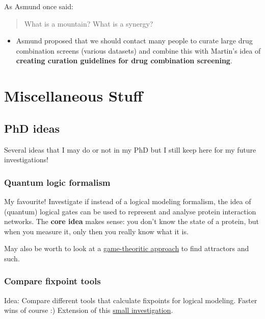 \documentclass[
  12pt,
]{book}
\providecommand{\tightlist}{%
  \setlength{\itemsep}{0pt}\setlength{\parskip}{0pt}}
\begin{document}
As Asmund once said:

\begin{quote}
What is a mountain? What is a synergy?
\end{quote}

\begin{itemize}
\tightlist
\item
  Asmund proposed that we should contact many people to curate large drug combination screens (various datasets) and combine this with Martin's idea of \textbf{creating curation guidelines for drug combination screening}.
\end{itemize}

\hypertarget{part-miscellaneous-stuff}{%
\part*{Miscellaneous Stuff}\label{part-miscellaneous-stuff}}

\hypertarget{ideas}{%
\chapter{PhD ideas}\label{ideas}}

Several ideas that I may do or not in my PhD but I still keep here for my future
investigations!

\hypertarget{quantum}{%
\section{Quantum logic formalism}\label{quantum}}

My favourite! Investigate if instead of a logical modeling formalism, the idea
of (quantum) logical gates can be used to represent and analyse protein interaction
networks.
The \textbf{core idea} makes sense: you don't know the state of a protein, but when
you measure it, only then you really know what it is.

May also be worth to look at a \href{https://doi.org/10.1007/11885191_18}{game-theoritic approach}
to find attractors and such.

\hypertarget{comp}{%
\section{Compare fixpoint tools}\label{comp}}

Idea: Compare different tools that calculate fixpoints for logical modeling.
Faster wins of course :) Extension of this \protect\hyperlink{attrToolCmp}{small investigation}.
\end{document}
